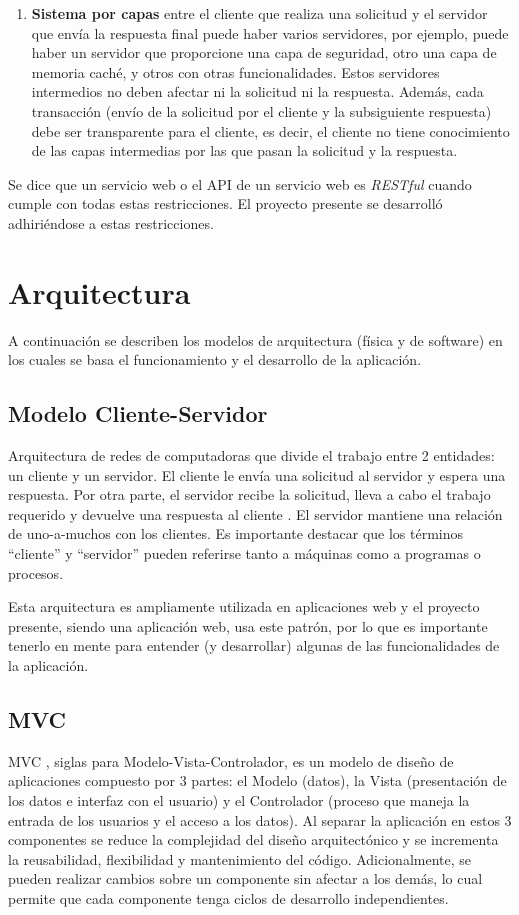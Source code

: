 \begin{enumerate}
        \item \textbf{Sistema por capas} entre el cliente que realiza una solicitud y el servidor que envía la respuesta final puede haber varios servidores, por ejemplo, puede haber un servidor que proporcione una capa de seguridad, otro una capa de memoria caché, y otros con otras funcionalidades. Estos servidores intermedios no deben afectar ni la solicitud ni la respuesta. Además, cada transacción (envío de la solicitud por el cliente y la subsiguiente respuesta) debe ser transparente para el cliente, es decir, el cliente no tiene conocimiento de las capas intermedias por las que pasan la solicitud y la respuesta.
    \end{enumerate}

    Se dice que un servicio web o el API de un servicio web es \textit{RESTful} cuando cumple con todas estas restricciones. El proyecto presente se desarrolló adhiriéndose a estas restricciones.

\section{Arquitectura}
A continuación se describen los modelos de arquitectura (física y de software) en los cuales se basa el funcionamiento y el desarrollo de la aplicación.

    \subsection{Modelo Cliente-Servidor} \label{clientServer}
    Arquitectura de redes de computadoras que divide el trabajo entre 2 entidades: un cliente y un servidor. El cliente le envía una solicitud al servidor y espera una respuesta. Por otra parte, el servidor recibe la solicitud, lleva a cabo el trabajo requerido y devuelve una respuesta al cliente \cite{redesTanenbaum}. El servidor mantiene una relación de uno-a-muchos con los clientes. Es importante destacar que los términos “cliente” y “servidor” pueden referirse tanto a máquinas como a programas o procesos.

    Esta arquitectura es ampliamente utilizada en aplicaciones web y el proyecto presente, siendo una aplicación web, usa este patrón, por lo que es importante tenerlo en mente para entender (y desarrollar) algunas de las funcionalidades de la aplicación.

    \subsection{MVC} \label{mvc}
    MVC \cite{mvcKrasner}, siglas para Modelo-Vista-Controlador, es un modelo de diseño de aplicaciones compuesto por 3 partes: el Modelo (datos), la Vista (presentación de los datos e interfaz con el usuario) y el Controlador (proceso que maneja la entrada de los usuarios y el acceso a los datos). Al separar la aplicación en estos 3 componentes se reduce la complejidad del diseño arquitectónico y se incrementa la reusabilidad, flexibilidad y mantenimiento del código. Adicionalmente, se pueden realizar cambios sobre un componente sin afectar a los demás, lo cual permite que cada componente tenga ciclos de desarrollo independientes.

